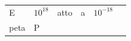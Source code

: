 {{\begin{center}
\begin{tabular}[t]{|l|l|l|l|l|l|}
        E &
    
    
        
                \begin{math}{10}^{18}\end{math}
               &
    
    
        atto &
    
    
        a &
    
    
        
                \begin{math}{10}^{-18}\end{math}
     \tabularnewline\cline{1-1}\cline{2-2}\cline{3-3}\cline{4-4}\cline{5-5}\cline{6-6}
    
    
        peta &
    
    
        P &
    
    
        

\end{tabular}
\end{center}}}
